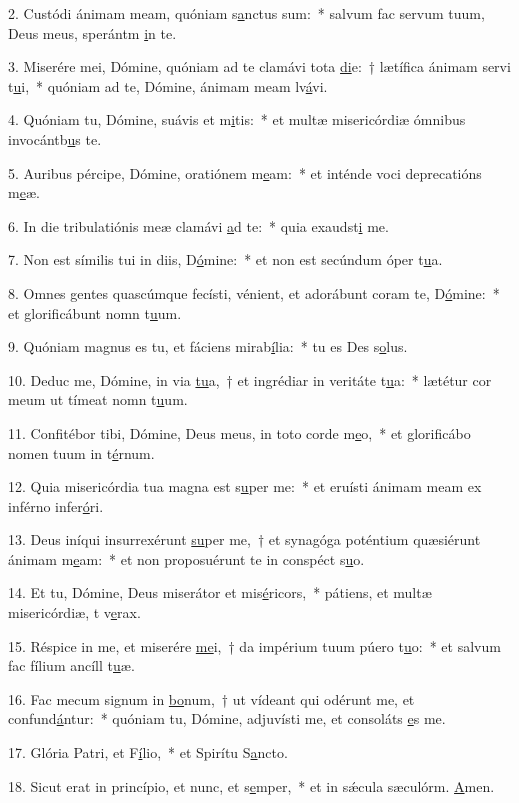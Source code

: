 2. Custódi ánimam meam, quóniam s\uline{a}nctus sum:~* salvum fac servum tuum, Deus meus, sperántm \uline{i}n te.\par 
3. Miserére mei, Dómine, quóniam ad te clamávi tota \uline{di}e:~† lætífica ánimam servi t\uline{u}i,~* quóniam ad te, Dómine, ánimam meam lv\uline{á}vi.\par 
4. Quóniam tu, Dómine, suávis et m\uline{i}tis:~* et multæ misericórdiæ ómnibus invocántb\uline{u}s te.\par 
5. Auribus pércipe, Dómine, oratiónem m\uline{e}am:~* et inténde voci deprecatións m\uline{e}æ.\par 
6. In die tribulatiónis meæ clamávi \uline{a}d te:~* quia exaudst\uline{i} me.\par 
7. Non est símilis tui in diis, D\uline{ó}mine:~* et non est secúndum óper t\uline{u}a.\par 
8. Omnes gentes quascúmque fecísti, vénient, et adorábunt coram te, D\uline{ó}mine:~* et glorificábunt nomn t\uline{u}um.\par 
9. Quóniam magnus es tu, et fáciens mirab\uline{í}lia:~* tu es Des s\uline{o}lus.\par 
10. Deduc me, Dómine, in via \uline{tu}a,~† et ingrédiar in veritáte t\uline{u}a:~* lætétur cor meum ut tímeat nomn t\uline{u}um.\par 
11. Confitébor tibi, Dómine, Deus meus, in toto corde m\uline{e}o,~* et glorificábo nomen tuum in t\uline{é}rnum.\par 
12. Quia misericórdia tua magna est s\uline{u}per me:~* et eruísti ánimam meam ex inférno infer\uline{ó}ri.\par 
13. Deus iníqui insurrexérunt \uline{su}per me,~† et synagóga poténtium quæsiérunt ánimam m\uline{e}am:~* et non proposuérunt te in conspéct s\uline{u}o.\par 
14. Et tu, Dómine, Deus miserátor et mis\uline{é}ricors,~* pátiens, et multæ misericórdiæ, t v\uline{e}rax.\par 
15. Réspice in me, et miserére \uline{me}i,~† da impérium tuum púero t\uline{u}o:~* et salvum fac fílium ancíll t\uline{u}æ.\par 
16. Fac mecum signum in \uline{bo}num,~† ut vídeant qui odérunt me, et confund\uline{á}ntur:~* quóniam tu, Dómine, adjuvísti me, et consoláts \uline{e}s me.\par 
17. Glória Patri, et F\uline{í}lio,~* et Spirítu S\uline{a}ncto.\par 
18. Sicut erat in princípio, et nunc, et s\uline{e}mper,~* et in sǽcula sæculórm. \uline{A}men.\par 
